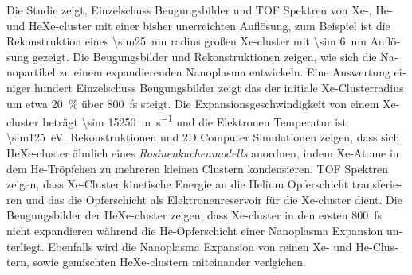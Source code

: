 \begin{otherlanguage}{german}
Die Studie zeigt, Einzelschuss Beugungsbilder und TOF Spektren von Xe-, He- und HeXe-cluster mit einer bisher unerreichten Auflösung, zum Beispiel ist die Rekonstruktion eines \SI{\sim25}{\nano\meter} radius großen Xe-cluster mit \SI{\sim 6}{\nano\meter} Auflösung gezeigt. Die Beugungsbilder und Rekonstruktionen zeigen, wie sich die Nanopartikel zu einem expandierenden Nanoplasma entwickeln. Eine Auswertung einiger hundert Einzelschuss Beugungsbilder zeigt das der initiale Xe-Clusterradius um etwa \SI{20}{\percent} über \SI{800}{\femto\second} steigt. Die Expansionsgeschwindigkeit von einem Xe-cluster beträgt \SI{\sim 15250}{\meter\per\second} und die Elektronen Temperatur ist \SI{\sim125}{\electronvolt}. Rekonstruktionen und 2D Computer Simulationen zeigen, dass sich HeXe-cluster ähnlich eines \textit{Rosinenkuchenmodells} anordnen, indem Xe-Atome in dem He-Tröpfchen zu mehreren kleinen Clustern kondensieren. TOF Spektren zeigen, dass Xe-Cluster kinetische Energie an die Helium Opferschicht transferieren und das die Opferschicht als Elektronenreservoir für die Xe-cluster dient. Die Beugungsbilder der HeXe-cluster zeigen, dass Xe-cluster in den ersten \SI{800}{\femto\second} nicht expandieren während die He-Opferschicht einer Nanoplasma Expansion unterliegt. Ebenfalls wird die Nanoplasma Expansion von reinen Xe- und He-Clustern, sowie gemischten HeXe-clustern miteinander verlgichen.
\end{otherlanguage}